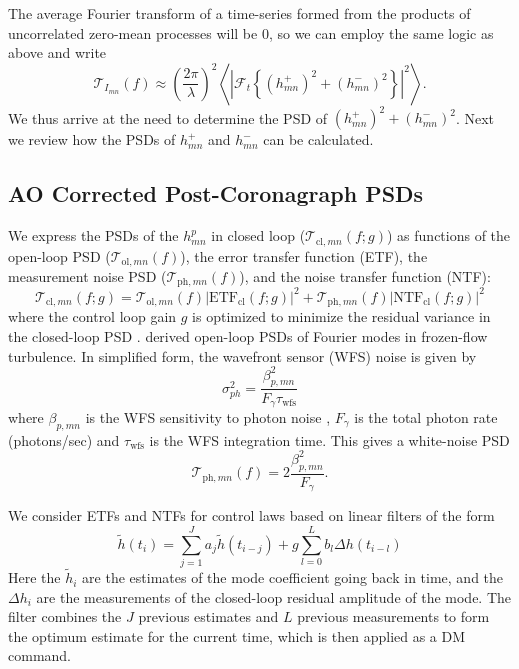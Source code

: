 \documentclass[10pt,preprint]{aastex631}
\begin{document}
The average Fourier transform of a time-series formed from the products of uncorrelated zero-mean processes will be 0, so we can employ the same logic as above and write
\begin{equation}
\mathcal{T}_{I_{mn}}(f) \approx \left(\frac{2\pi}{\lambda}\right)^2  \left\langle \left| \mathcal{F}_t\left\{   (h_{mn}^{+})^2 + (h_{mn}^{-})^2  \right\} \right|^2 \right\rangle  .
\label{eqn:psd_h2}
\end{equation}
We thus arrive at the need to determine the PSD of $(h_{mn}^{+})^2 + (h_{mn}^{-})^2$.  Next we review how the PSDs of $h_{mn}^{+}$ and $h_{mn}^{-}$ can be calculated.

\subsection{AO Corrected Post-Coronagraph PSDs}

We express the PSDs of the $h_{mn}^p$ in closed loop ($\mathcal{T}_{\mathrm{cl},mn}(f;g)$) as functions of the open-loop PSD ($\mathcal{T}_{\mathrm{ol},mn}(f)$), the error transfer function (ETF), the measurement noise PSD ($\mathcal{T}_{\mathrm{ph},mn}(f)$), and the noise transfer function (NTF): 
\begin{equation}
\mathcal{T}_{\mathrm{cl},mn}(f;g) = \mathcal{T}_{\mathrm{ol},mn}(f) \left| \mbox{ETF}_{\mathrm{cl}}(f;g) \right|^2 + \mathcal{T}_{\mathrm{ph},mn}(f) \left| \mbox{NTF}_{\mathrm{cl}}(f;g) \right|^2 
\label{eqn:cl_psd}
\end{equation}
where the control loop gain $g$ is optimized to minimize the residual variance in the closed-loop PSD \citep{1999aoa..book.....R_ch6,2016ApOpt..55..323P}. \citet{2018JATIS...4a9001M} derived open-loop PSDs of Fourier modes in frozen-flow turbulence.  In simplified form, the wavefront sensor (WFS) noise is given by
\begin{equation}
\sigma_{ph}^2 = \frac{\beta_{p,mn}^2}{F_\gamma \tau_\mathrm{wfs}}
\label{eqn:photon_noise}
\end{equation}
where $\beta_{p,mn}$ is the WFS sensitivity to photon noise \citep{2005ApJ...629..592G}, $F_\gamma$ is the total photon rate (photons/sec) and $\tau_\mathrm{wfs}$ is the WFS integration time.  This gives a white-noise PSD
\begin{equation}
\mathcal{T}_{\mathrm{ph},mn}(f) = 2\frac{\beta_{p,mn}^2}{F_\gamma }.
\end{equation}


We consider ETFs and NTFs for control laws based on linear filters of the form
\begin{equation}
\widetilde{h} (t_i) = \sum_{j=1}^J a_j \widetilde{h}(t_{i-j}) + g\sum_{l=0}^L b_l \Delta h (t_{i-l})  
\label{eqn:linfilt}
\end{equation}
Here the $\widetilde{h}_i$ are the estimates of the mode coefficient going back in time, and  the $\Delta h_i$ are the measurements of the closed-loop residual amplitude of the mode.  The filter combines the $J$ previous estimates and $L$ previous measurements to form the optimum estimate for the current time, which is then applied as a DM command.  
\end{document}
